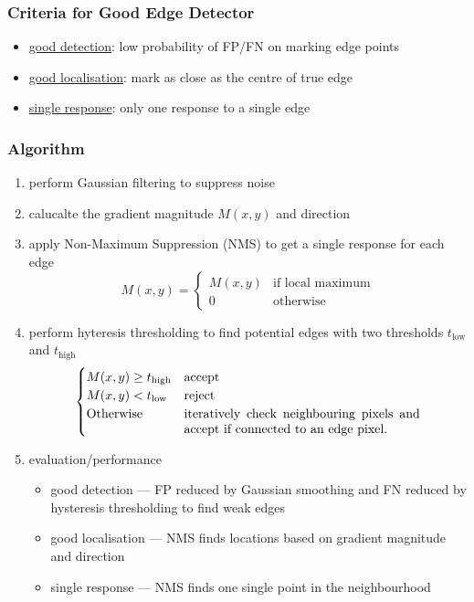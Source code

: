 \documentclass[twocolumn,landscape,10pt]{article}
\theoremstyle{definition}
\begin{document}
\subsubsection{Criteria for Good Edge Detector}

\begin{itemize}
    \item \underline{good detection}: low probability of FP/FN on marking edge points
    \item \underline{good localisation}: mark as close as the centre of true edge
    \item \underline{single response}: only one response to a single edge
\end{itemize} 

\subsubsection{Algorithm}

\begin{enumerate}
    \item perform Gaussian filtering to suppress noise
    \item calucalte the gradient magnitude $M(x,y)$ and direction
    \item apply Non-Maximum Suppression (NMS) to get a single response for each
        edge
        \[
            M(x,y)=
            \begin{cases}
                M(x,y) & \text{if local maximum} \\
                0 & \text{otherwise}
            \end{cases} 
        \]
    \item perform hyteresis thresholding to find potential edges with two
        thresholds $t_\text{low}$ and $t_\text{high}$\\
        \[
            \begin{cases}
                M(x,y) \ge t_\text{high} & \text{accept} \\
                M(x,y) < t_\text{low} & \text{reject} \\
                \text{Otherwise} & \text{\parbox[t]{6.5cm}{iteratively check neighbouring pixels 
                and accept if connected to an edge pixel.}}
            \end{cases} 
        \]
    \item evaluation/performance
        \begin{itemize}
            \item good detection --- FP reduced by Gaussian smoothing and FN
                reduced by hysteresis thresholding to find weak edges
            \item good localisation --- NMS finds locations based on gradient
                magnitude and direction
            \item single response --- NMS finds one single point in the
                neighbourhood
        \end{itemize} 
\end{enumerate} 
\end{document}
